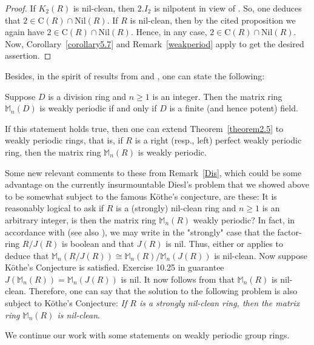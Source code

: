 \documentclass[12pt]{amsart}
\theoremstyle{definition}
\theoremstyle{remark}
\numberwithin{equation}{section}
\begin{document}
\begin{proof}
If $K_2(R)$ is nil-clean, then $2.I_2$ is nilpotent in view of \cite[Proposition 3.14]{D13}. So, one deduces that $2 \in \mathrm{C}(R) \cap \mathrm{Nil}(R)$. If $R$ is nil-clean, then by the cited proposition we again have $2\in \mathrm{C}(R)\cap \mathrm{Nil}(R)$. Hence, in any case, $2 \in \mathrm{C}(R) \cap \mathrm{Nil}(R)$. Now, Corollary~\ref{corollary5.7} and Remark~\ref{weakperiod} apply to get the desired assertion.
\end{proof}

Besides, in the spirit of results from \cite{BCDM} and \cite{KLZ}, one can state the following:

\medskip

 Suppose $D$ is a division ring and $n\geq 1$ is an integer. Then the matrix ring $\mathbb{M}_n(D)$ is weakly periodic if and only if $D$ is a finite (and hence potent) field.

\medskip

If this statement holds true, then one can extend Theorem~\ref{theorem2.5} to weakly periodic rings, that is, if $R$ is a right (resp., left) perfect weakly periodic ring, then the matrix ring $\mathbb{M}_n(R)$ is weakly periodic. 

Some new relevant comments to these from Remark~\ref{Dis}, which could be some advantage on the currently insurmountable Diesl's problem that we showed above to be somewhat subject to the famous K\"othe's conjecture, are these: It is reasonably logical to ask if $R$ is a (strongly) nil-clean ring and $n\geq 1$ is an arbitrary integer, is then the matrix ring $\mathbb{M}_n(R)$ weakly periodic? In fact, in accordance with \cite{DL} (see also \cite{KWZ}), we may write in the "strongly" case that the factor-ring $R/J(R)$ is boolean and that $J(R)$ is nil. Thus, either \cite{BCDM} or \cite{D2} applies to deduce that $\mathbb{M}_n(R/J(R))\cong \mathbb{M}_n(R)/\mathbb{M}_n(J(R))$ is nil-clean. Now suppose K\"othe's Conjecture is satisfied. Exercise 10.25 in \cite{L} guarantee $J(\mathbb{M}_n(R))=\mathbb{M}_n(J(R))$ is nil. It now follows from \cite[Proposition 3.15]{D13} that $\mathbb{M}_n(R)$ is nil-clean. Therefore, one can say that the solution to the following problem is also subject to K\"othe's Conjecture: {\it If $R$ is a strongly nil-clean ring, then the matrix ring $\mathbb{M}_n(R)$ is nil-clean}.

\medskip

We continue our work with some statements on weakly periodic group rings.
\end{document}
